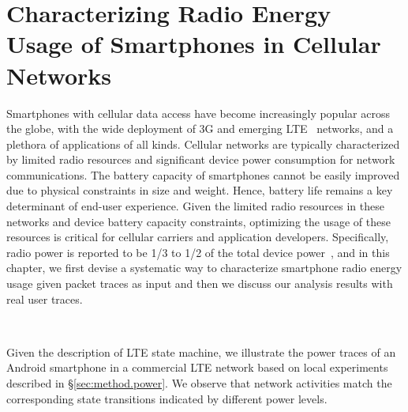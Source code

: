 \chapter{Characterizing Radio Energy Usage of Smartphones in Cellular Networks} 
\label{chap:power}

Smartphones with cellular data access have become increasingly popular across the globe, with the wide deployment of 3G and emerging LTE~\cite{3gpp.lte} networks, and a plethora of applications of all kinds. Cellular networks are typically characterized by limited radio resources and significant device power consumption for network communications. The battery capacity of smartphones cannot be easily improved due to physical constraints in size and weight. Hence, battery life remains a key determinant of end-user experience. Given the limited radio resources in these networks and device battery capacity constraints, optimizing the usage of these resources is critical for cellular carriers and application developers. Specifically, radio power is reported to be 1/3 to 1/2 of the total device power~\cite{mobisys.aro}, and in this chapter, we first devise a systematic way to characterize smartphone radio energy usage given packet traces as input and then we discuss our analysis results with real user traces.

\label{sec:background.power}

\begin{figure}[t]
\centering
{} \\
\label{fig:power.trace.all}
\end{figure}


Given the description of LTE state machine, we illustrate the power traces of an Android smartphone in a commercial LTE network based on local experiments described in \S\ref{sec:method.power}. We observe that network activities match the corresponding state transitions indicated by different power levels.


